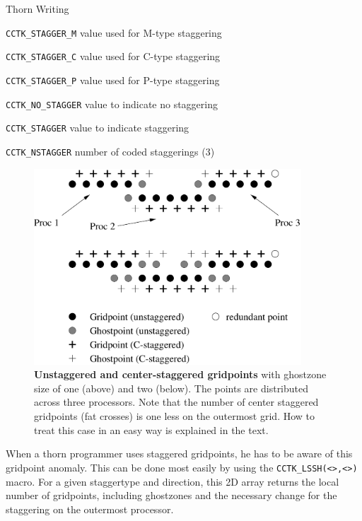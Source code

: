 \begin{cactuspart}{Thorn Writing}
\begin{Lentry}
\item[\texttt{CCTK\_STAGGER\_M}]  value used for M-type staggering
\item[\texttt{CCTK\_STAGGER\_C}]  value used for C-type staggering
\item[\texttt{CCTK\_STAGGER\_P}]  value used for P-type staggering
\item[\texttt{CCTK\_NO\_STAGGER}] value to indicate no staggering
\item[\texttt{CCTK\_STAGGER}]    value to indicate staggering
\item[\texttt{CCTK\_NSTAGGER}]   number of coded staggerings (3)
\end{Lentry}


\begin{figure}[ht]
  \def\epsfsize#1#2{0.45#1}
\begin{center}
\includegraphics[angle=0,width=10cm]{staggering2}
\end{center}
\caption[]{\small {\bf Unstaggered and center-staggered gridpoints} with
ghostzone size of one (above) and two (below). The points are
distributed across three processors. Note that the number of
center staggered gridpoints (fat crosses) is one less on the outermost grid. How to
treat this case in an easy way is explained in the text. }
\label{fig:stagger2}
\end{figure}

When a thorn programmer uses staggered gridpoints, he has to be aware
of this gridpoint anomaly. This can be done most easily by using the
\texttt{CCTK\_LSSH(<>,<>)} macro.
For a given staggertype and direction, this 2D array returns the local
number of gridpoints, including ghostzones and the necessary change
for the staggering on the outermost processor.


\end{cactuspart}
